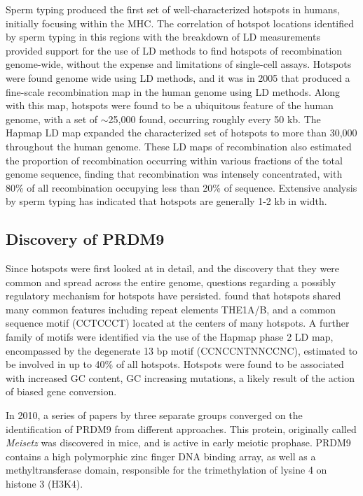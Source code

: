 Sperm typing produced the first set of well-characterized hotspots in humans, initially focusing within the MHC\cite{Jeffreys2000,Jeffreys2001}.
The correlation of hotspot locations identified by sperm typing in this regions with the breakdown of LD measurements provided support for the use of LD methods to find hotspots of recombination genome-wide, without the expense and limitations of single-cell assays\cite{Jeffreys2001}.
Hotspots were found genome wide using LD methods\cite{Mcvean2004}, and it was in 2005 that \citet{Myers2005} produced a fine-scale recombination map in the human genome using LD methods.
Along with this map, hotspots were found to be a ubiquitous feature of the human genome, with a set of $\sim$25,000 found, occurring roughly every 50 kb.
The Hapmap LD map expanded the characterized set of hotspots to more than 30,000 throughout the human genome\cite{hapmap2007}.
These LD maps of recombination also estimated the proportion of recombination occurring within various fractions of the total genome sequence, finding that recombination was intensely concentrated, with 80\% of all recombination occupying less than 20\% of sequence.
Extensive analysis by sperm typing has indicated that hotspots are generally 1-2 kb in width\cite{Jeffreys2004a,Arnheim2003}.


\subsection{Discovery of PRDM9}

Since hotspots were first looked at in detail, and the discovery that they were common and spread across the entire genome, questions regarding a possibly regulatory mechanism for hotspots have persisted.
\citet{Myers2005} found that hotspots shared many common features including repeat elements THE1A/B, and a common sequence motif (CCTCCCT) located at the centers of many hotspots.
A further family of motifs were identified via the use of the Hapmap phase 2 LD map\cite{hapmap2007}, encompassed by the degenerate 13 bp motif (CCNCCNTNNCCNC)\cite{Myers2008}, estimated to be involved in up to 40\% of all hotspots.
Hotspots were found to be associated with increased GC content, GC increasing mutations, a likely result of the action of biased gene conversion\cite{Spencer2006}.


In 2010, a series of papers by three separate groups converged on the identification of PRDM9 from different approaches.
This protein, originally called \textit{Meisetz} was discovered in mice, and is active in early meiotic prophase\cite{Hayashi2005}.
PRDM9 contains a high polymorphic zinc finger DNA binding array, as well as a methyltransferase domain, responsible for the trimethylation of lysine 4 on histone 3 (H3K4).


